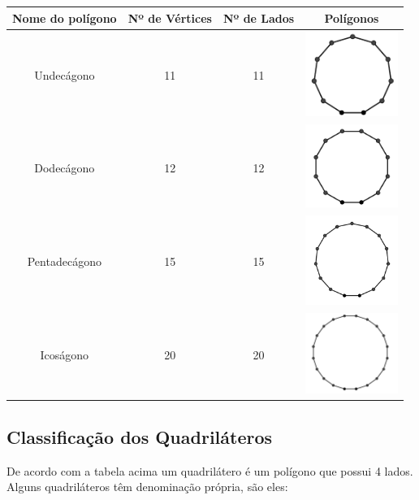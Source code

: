  \begin{table}[H]
 \centering
 \begin{tabular}{|c|c|c|c|} \hline
 \rowcolor{gray}
 Nome do polígono & Nº de Vértices & Nº de Lados & Polígonos  \\ \hline
 Undecágono & 11 & 11 & \includegraphics[width=3cm]{./cap_geometria/figs/pol11} \\ \hline
 Dodecágono & 12 & 12 & \includegraphics[width=3cm]{./cap_geometria/figs/pol12} \\ \hline
 Pentadecágono & 15 & 15 & \includegraphics[width=3cm]{./cap_geometria/figs/pol15} \\ \hline
 Icoságono & 20 & 20 & \includegraphics[width=3cm]{./cap_geometria/figs/pol20} \\ \hline
 \end{tabular}
\end{table}


\subsection{Classificação dos Quadriláteros}

De acordo com a tabela acima um quadrilátero é um polígono que possui 4 lados. Alguns quadriláteros têm denominação própria, são eles:

